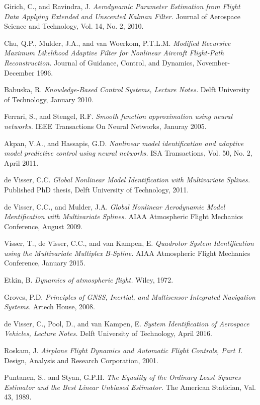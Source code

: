 \documentclass[]{aiaa-tc}%
\begin{document}
\begin{thebibliography}{9}
Girich, C., and Ravindra, J.\textit{ Aerodynamic Parameter Estimation from Flight Data Applying Extended and Unscented Kalman Filter.} Journal of Aerospace Science and Technology, Vol. 14, No. 2, 2010.

Chu, Q.P., Mulder, J.A., and van Woerkom, P.T.L.M.\textit{ Modified Recursive Maximum Likelihood Adaptive Filter for Nonlinear Aircraft Flight-Path Reconstruction.} Journal of Guidance, Control, and Dynamics, November-December 1996.

Babuska, R.\textit{ Knowledge-Based Control Systems, Lecture Notes.} Delft University of Technology, January 2010.

Ferrari, S., and Stengel, R.F.\textit{ Smooth function approximation using neural networks.} IEEE Transactions On Neural Networks, Januray 2005.

Akpan, V.A., and Hassapis, G.D.\textit{ Nonlinear model identification and adaptive model predictive control using neural networks.} ISA Transactions, Vol. 50, No. 2, April 2011.

de Visser, C.C.\textit{ Global Nonlinear Model Identification with Multivariate Splines.} Published PhD thesis, Delft University of Technology, 2011.

de Visser, C.C., and Mulder, J.A.\textit{ Global Nonlinear Aerodynamic Model Identification with Multivariate Splines.} AIAA Atmospheric Flight Mechanics Conference, August 2009.

Visser, T., de Visser, C.C., and van Kampen, E.\textit{ Quadrotor System Identification using the Multivariate Multiplex B-Spline.} AIAA Atmospheric Flight Mechanics Conference, January 2015.

Etkin, B.\textit{ Dynamics of atmospheric flight.} Wiley, 1972.

Groves, P.D.\textit{ Principles of GNSS, Inertial, and Multisensor Integrated Navigation Systems.} Artech House, 2008.

de Visser, C., Pool, D., and van Kampen, E.\textit{ System Identification of Aerospace Vehicles, Lecture Notes.} Delft University of Technology, April 2016.

Roskam, J.\textit{ Airplane Flight Dynamics and Automatic Flight Controls, Part I.} Design, Analysis and Research Corporation, 2001.

Puntanen, S., and Styan, G.P.H.\textit{ The Equality of the Ordinary Least Squares Estimator and the Best Linear Unbiased Estimator.} The American Statician, Val. 43, 1989.


\end{thebibliography}
\end{document}
